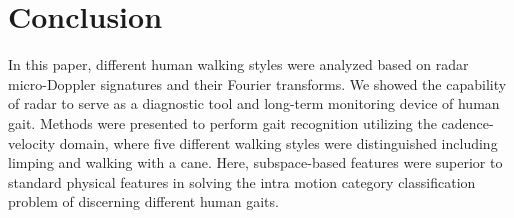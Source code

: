 \section{Conclusion}\label{sec:conclusion}

In this paper, different human walking styles were analyzed based on radar micro-Doppler signatures and their Fourier transforms. We showed the capability of radar to serve as a diagnostic tool and long-term monitoring device of human gait. Methods were presented to perform gait recognition utilizing the cadence-velocity domain, where five different walking styles were distinguished including limping and walking with a cane. Here, subspace-based features were superior to standard physical features in solving the intra motion category classification problem of discerning different human gaits.